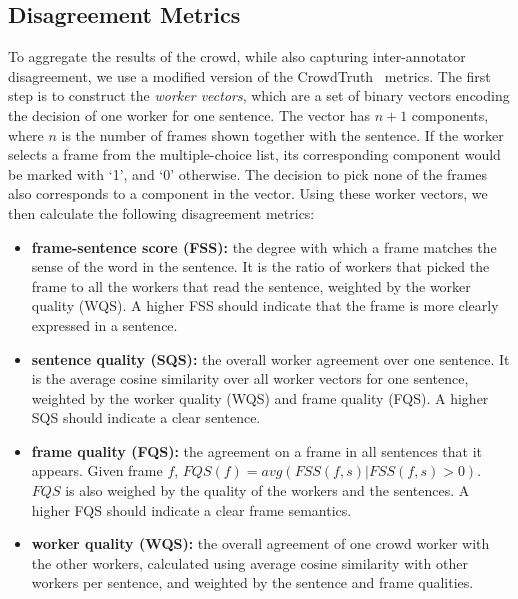 \subsection{Disagreement Metrics}

To aggregate the results of the crowd, while also capturing inter-annotator disagreement, we use a modified version of the CrowdTruth~\cite{aroyo2014threesides} metrics. The first step is to construct the \textit{worker vectors}, which are a set of binary vectors encoding the decision of one worker for one sentence. The vector has $n+1$ components, where $n$ is the number of frames shown together with the sentence. If the worker selects a frame from the multiple-choice list, its corresponding component would be marked with `1', and `0' otherwise. The decision to pick none of the frames also corresponds to a component in the vector. Using these worker vectors, we then calculate the following disagreement metrics:

\begin{itemize}
\item \textbf{frame-sentence score (FSS):} the degree with which a frame matches the sense of the word in the sentence. It is the ratio of workers that picked the frame to all the workers that read the sentence, weighted by the worker quality (WQS).  A higher FSS should indicate that the frame is more clearly expressed in a sentence.

\item \textbf{sentence quality (SQS):} the overall worker agreement over one sentence. It is the average cosine similarity over all worker vectors for one sentence, weighted by the worker quality (WQS) and frame quality (FQS). A higher SQS should indicate a clear sentence.

\item \textbf{frame quality (FQS):} the agreement on a frame in all sentences that it appears. Given frame $f$, $ FQS(f) = avg(FSS(f,s) | FSS(f,s) > 0)$. $FQS$ is also weighed by the quality of the workers and the sentences.  A higher FQS should indicate a clear frame semantics.

\item \textbf{worker quality (WQS):} the overall agreement of one crowd worker with the other workers, calculated using average cosine similarity with other workers per sentence, and weighted by the sentence and frame qualities.

\end{itemize}


